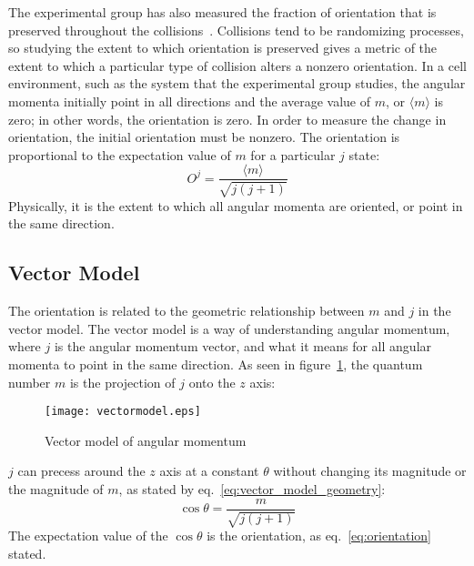 \documentclass[letterpaper,titlepage,12pt]{article}
\begin{document}
The experimental group has also measured the fraction of orientation that is
preserved throughout the collisions~\cite{Hue15_conversation}.  Collisions tend
to be randomizing processes, so studying the extent to which orientation is
preserved gives a metric of the extent to which a particular type of collision
alters a nonzero orientation.  In a cell environment, such as the system that
the experimental group studies, the angular momenta initially point in all
directions and the average value of $m$, or $\langle m\rangle$ is zero; in
other words, the orientation is zero.  In order to measure the change in
orientation, the initial orientation must be nonzero.  The orientation is
proportional to the expectation value of $m$ for a particular $j$ state:
\begin{equation}
    O^j=\frac{\langle m\rangle}{\sqrt{j(j+1)}}
    \label{eq:orientation}
\end{equation}
Physically, it is the extent to which all angular momenta are oriented, or
point in the same direction.

\subsection{Vector Model}
The orientation is  related to the geometric relationship between $m$ and $j$
in the vector model.  The vector model is a way of understanding angular
momentum, where $j$ is the angular momentum vector, and what it means for all
angular momenta to point in the same direction.  As seen in
figure~\ref{fig:vectormodel}, the quantum number $m$ is the projection of $j$
onto the $z$ axis:
\begin{figure}[ht]
    \centering
    \texttt{[image: vectormodel.eps]}
    \caption{Vector model of angular momentum}
\label{fig:vectormodel}
\end{figure}
$j$ can precess around the $z$ axis at a constant $\theta$ without changing its
magnitude or the magnitude of $m$, as stated by
eq.~\ref{eq:vector_model_geometry}:
\begin{equation}
    \cos\theta=\frac{m}{\sqrt{j(j+1)}}
    \label{eq:vector_model_geometry}
\end{equation}
The expectation value of the $\cos\theta$ is the orientation, as
eq.~\ref{eq:orientation} stated.
\end{document}
